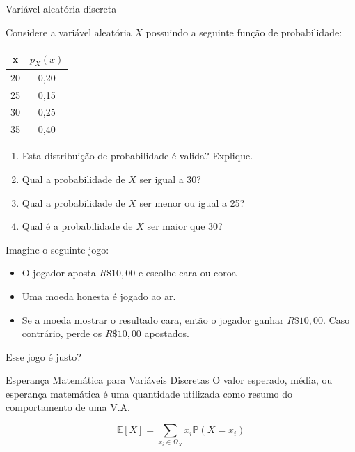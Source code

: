\begin{frame}{Variável aleatória discreta}
\begin{exemplo}[12]
    

    Considere a variável aleatória $X$ possuindo a seguinte função de probabilidade:

    \begin{table}[]
\begin{tabular}{cc}
\hline
x  & $p_X(x)$ \\ \hline
20 & 0,20     \\
25 & 0,15     \\
30 & 0,25     \\
35 & 0,40     \\ \hline
\end{tabular}
\end{table}

\begin{enumerate}
    \item Esta distribuição de probabilidade é valida? Explique.
    \item Qual a probabilidade de $X$ ser igual a 30?
    \item Qual a probabilidade de $X$ ser menor ou igual a 25?
    \item Qual é a probabilidade de $X$ ser maior que 30?
\end{enumerate}
\end{exemplo}
\end{frame}
\begin{frame}
    Imagine o seguinte jogo:
    \begin{itemize}
        \item O jogador aposta $R\$ 10,00$ e escolhe cara ou coroa
        \item Uma moeda honesta é jogado ao ar.
        \item Se a moeda mostrar o resultado cara, então o jogador ganhar  $R\$ 10,00$. Caso contrário, perde os $R\$ 10,00$ apostados. 
    \end{itemize}

    \pause
    Esse jogo é justo?
\end{frame}

\begin{frame}{Esperança Matemática para Variáveis Discretas }
    O valor esperado, média, ou esperança matemática é uma quantidade utilizada como resumo do comportamento de uma V.A. 

    $$\mathbb{E}[X] = \sum_{x_i \in \Omega_X} x_i \mathds{P}(X=x_i)$$
\end{frame}

